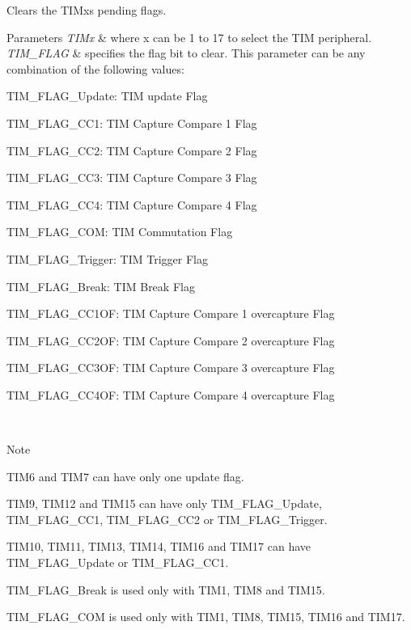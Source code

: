 Clears the T\+I\+Mx\textquotesingle{}s pending flags. 


\begin{DoxyParams}{Parameters}
{\em T\+I\+Mx} & where x can be 1 to 17 to select the T\+IM peripheral. \\
\hline
{\em T\+I\+M\+\_\+\+F\+L\+AG} & specifies the flag bit to clear. This parameter can be any combination of the following values\+: \begin{DoxyItemize}
\item T\+I\+M\+\_\+\+F\+L\+A\+G\+\_\+\+Update\+: T\+IM update Flag \item T\+I\+M\+\_\+\+F\+L\+A\+G\+\_\+\+C\+C1\+: T\+IM Capture Compare 1 Flag \item T\+I\+M\+\_\+\+F\+L\+A\+G\+\_\+\+C\+C2\+: T\+IM Capture Compare 2 Flag \item T\+I\+M\+\_\+\+F\+L\+A\+G\+\_\+\+C\+C3\+: T\+IM Capture Compare 3 Flag \item T\+I\+M\+\_\+\+F\+L\+A\+G\+\_\+\+C\+C4\+: T\+IM Capture Compare 4 Flag \item T\+I\+M\+\_\+\+F\+L\+A\+G\+\_\+\+C\+OM\+: T\+IM Commutation Flag \item T\+I\+M\+\_\+\+F\+L\+A\+G\+\_\+\+Trigger\+: T\+IM Trigger Flag \item T\+I\+M\+\_\+\+F\+L\+A\+G\+\_\+\+Break\+: T\+IM Break Flag \item T\+I\+M\+\_\+\+F\+L\+A\+G\+\_\+\+C\+C1\+OF\+: T\+IM Capture Compare 1 overcapture Flag \item T\+I\+M\+\_\+\+F\+L\+A\+G\+\_\+\+C\+C2\+OF\+: T\+IM Capture Compare 2 overcapture Flag \item T\+I\+M\+\_\+\+F\+L\+A\+G\+\_\+\+C\+C3\+OF\+: T\+IM Capture Compare 3 overcapture Flag \item T\+I\+M\+\_\+\+F\+L\+A\+G\+\_\+\+C\+C4\+OF\+: T\+IM Capture Compare 4 overcapture Flag \end{DoxyItemize}
\\
\hline
\end{DoxyParams}
\begin{DoxyNote}{Note}

\begin{DoxyItemize}
\item T\+I\+M6 and T\+I\+M7 can have only one update flag.
\item T\+I\+M9, T\+I\+M12 and T\+I\+M15 can have only T\+I\+M\+\_\+\+F\+L\+A\+G\+\_\+\+Update, T\+I\+M\+\_\+\+F\+L\+A\+G\+\_\+\+C\+C1, T\+I\+M\+\_\+\+F\+L\+A\+G\+\_\+\+C\+C2 or T\+I\+M\+\_\+\+F\+L\+A\+G\+\_\+\+Trigger.
\item T\+I\+M10, T\+I\+M11, T\+I\+M13, T\+I\+M14, T\+I\+M16 and T\+I\+M17 can have T\+I\+M\+\_\+\+F\+L\+A\+G\+\_\+\+Update or T\+I\+M\+\_\+\+F\+L\+A\+G\+\_\+\+C\+C1.
\item T\+I\+M\+\_\+\+F\+L\+A\+G\+\_\+\+Break is used only with T\+I\+M1, T\+I\+M8 and T\+I\+M15.
\item T\+I\+M\+\_\+\+F\+L\+A\+G\+\_\+\+C\+OM is used only with T\+I\+M1, T\+I\+M8, T\+I\+M15, T\+I\+M16 and T\+I\+M17.
\end{DoxyItemize}
\end{DoxyNote}

